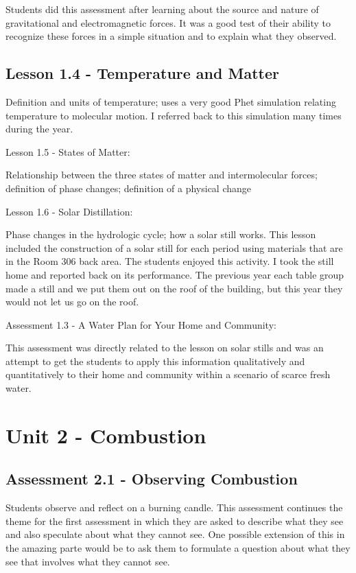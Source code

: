 \documentclass[12pt]{article}
\begin{document}
Students did this assessment after learning about the source and nature of gravitational and electromagnetic forces. It was a good test of their ability to recognize these forces in a simple situation and to explain what they observed.

\subsection{Lesson 1.4 - Temperature and Matter} 

Definition and units of temperature; uses a very
good Phet simulation relating temperature to molecular motion. I referred back to this
simulation many times during the year.

Lesson 1.5 - States of Matter: 

Relationship between the three states of matter and
intermolecular forces; definition of phase changes; definition of a physical change

Lesson 1.6 - Solar Distillation: 

Phase changes in the hydrologic cycle; how a solar still
works. This lesson included the construction of a solar still for each period using
materials that are in the Room 306 back area. The students enjoyed this activity. I took
the still home and reported back on its performance. The previous year each table group
made a still and we put them out on the roof of the building, but this year they would not
let us go on the roof.

Assessment 1.3 - A Water Plan for Your Home and Community: 

This assessment was directly
related to the lesson on solar stills and was an attempt to get the students to apply this
information qualitatively and quantitatively to their home and community within a scenario of
scarce fresh water.


\section{Unit 2 - Combustion}

\subsection*{Assessment 2.1 - Observing Combustion} 

Students observe and reflect on a burning candle.
This assessment continues the theme for the first assessment in which they are asked to
describe what they see and also speculate about what they cannot see. One possible extension
of this in the amazing parte would be to ask them to formulate a question about what they see
that involves what they cannot see.
\end{document}
